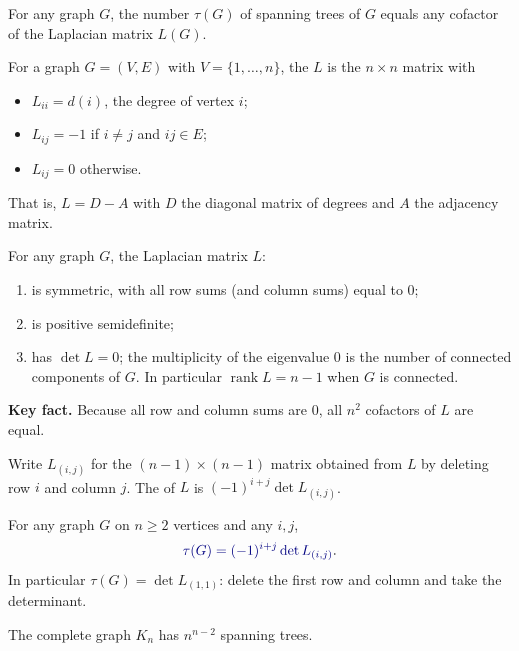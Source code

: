 \documentclass[8pt,a4paper,landscape]{extarticle}
\begin{document}
\begin{cscolumns}
\begin{theorem}[Kirchhoff, 1847]
For any graph $G$, the number $\tau(G)$ of spanning trees of $G$ equals any cofactor of the Laplacian matrix $L(G)$.
\end{theorem}
\begin{definition}
For a graph $G=(V,E)$ with $V=\{1,\dots,n\}$, the  $L$ is the $n\times n$ matrix with
\begin{itemize}
\item $L_{ii}=d(i)$, the degree of vertex $i$;
\item $L_{ij}=-1$ if $i\ne j$ and $ij\in E$;
\item $L_{ij}=0$ otherwise.
\end{itemize}
That is, $L=D-A$ with $D$ the diagonal matrix of degrees and $A$ the adjacency matrix.
\end{definition}
\begin{theorem}[Lemma]
For any graph $G$, the Laplacian matrix $L$:
\begin{enumerate}[label=\arabic*.]
\item is symmetric, with all row sums (and column sums) equal to 0;
\item is positive semidefinite;
\item has $\det L=0$; the multiplicity of the eigenvalue 0 is the number of connected components of $G$. In particular $\operatorname{rank}L=n-1$ when $G$ is connected.
\end{enumerate}
\end{theorem}
\textbf{Key fact.} Because all row and column sums are 0, all $n^2$ cofactors of $L$ are equal.
\begin{definition}[Cofactor]
Write $L_{(i,j)}$ for the $(n-1)\times(n-1)$ matrix obtained from $L$ by deleting row $i$ and column $j$. The  of $L$ is $(-1)^{i+j}\det L_{(i,j)}$.
\end{definition}
\begin{theorem}
For any graph $G$ on $n\ge 2$ vertices and any $i,j$,
\[ {\color{csBlue}\tau(G)=(-1)^{i+j}\det L_{(i,j)}}. \]
In particular $\tau(G)=\det L_{(1,1)}$: delete the first row and column and take the determinant.
\end{theorem}
\begin{theorem}
The complete graph $K_n$ has $n^{n-2}$ spanning trees.
\end{theorem}


\end{cscolumns}
\end{document}
